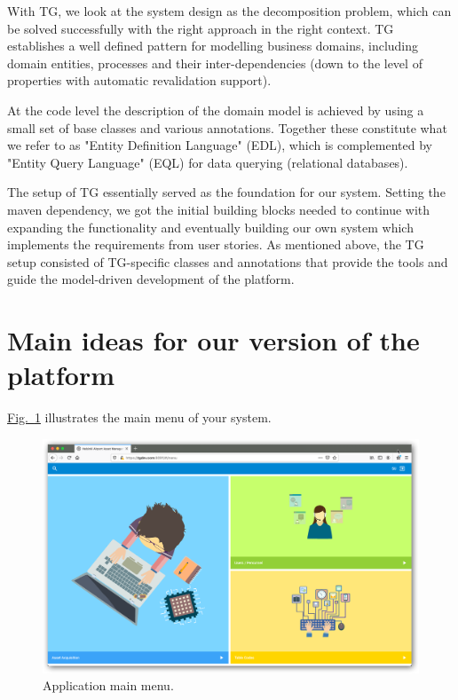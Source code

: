 \documentclass[a4paper, 12pt, final]{hitec}
\begin{document}
  With TG, we look at the system design as the decomposition problem,
  which can be solved successfully with the right approach in the right context.
  TG establishes a well defined pattern for modelling business domains,
  including domain entities, processes and their inter-dependencies (down to the
  level of properties with automatic revalidation support).
  
  At the code level the
  description of the domain model is achieved by using a small set of base classes
  and various annotations. Together these constitute what we refer to as "Entity
  Definition Language" (EDL), which is complemented by "Entity Query Language"
  (EQL) for data querying (relational databases).

  The setup of TG essentially served as the foundation for our system.
  Setting the maven dependency, we got the initial building blocks needed
  to continue with expanding the functionality and eventually building our own
  system which implements the requirements from user stories. As mentioned above,
  the TG setup consisted of TG-specific classes and annotations that provide the
  tools and guide the model-driven development of the platform.
  \clearpage

  \section{Main ideas for our version of the platform}\label{sec:02}
  \hyperref[sec:01_01:fig:01]{Fig.~\ref*{sec:01_01:fig:01}} illustrates the main menu of your system.
	\begin{figure}[!htbp]
	\centering
	\includegraphics[width=0.95\linewidth]{images/01-main-menu.png}
	\caption{Application main menu.}\label{sec:01_01:fig:01}
  \end{figure}
  \clearpage
\end{document}
